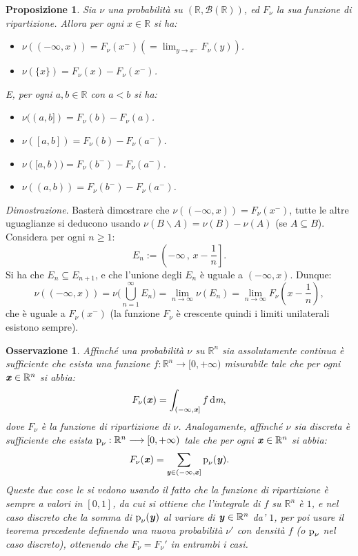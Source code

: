 \documentclass[11pt]{book}
\makeatletter
\theoremstyle{Definizione}
\theoremstyle{TeoremaProposizioneLemmaCorollario}
\newtheorem{mypropo}[myteo]{Proposizione}
\theoremstyle{OsservazioneNota}
\newtheorem{myobs}{Osservazione}[section]
\renewenvironment{proof}[1][\proofname]{\par
  \normalfont \topsep6\p@\@plus6\p@\relax
  \trivlist
  \item[\hskip\labelsep
        \itshape
    #1\@addpunct{.}]\ignorespaces
}{%
  \endtrivlist\@endpefalse
}
\newcommand{\R}{\mathbb{R}}
\newcommand{\tolto}{\smallsetminus}
\newcommand{\gri}[1]{\textbf{\textit{{#1}}}}
\renewcommand{\d}{\mathrm{d}}
\newcommand{\dm}{\,\d \textit{m}}
\newcommand{\p}{\textup{p}}
\renewenvironment{proof}{\textsl{Dimostrazione}.}{}
\makeatother
\begin{document}
\begin{boxpro}
\begin{mypropo}
Sia $\nu$ una probabilità su $(\R,\mathcal{B}(\R))$, ed $F_\nu$ la sua funzione di ripartizione. Allora per ogni $x\in \R$ si ha:
\begin{itemize}
\item[$(i)$] $\nu((-\infty,x)) = F_\nu(x^-) (= \lim_{y \to x^-} F_\nu(y))$.
\item[$(ii)$] $\nu(\{x\}) = F_\nu(x)-F_\nu(x^-)$.
\end{itemize}
E, per ogni $a,b\in \R$ con $a<b$ si ha:
\begin{itemize}
\item[$(i)'$] $\nu((a,b]) = F_\nu(b)-F_\nu(a)$.
\item[$(ii)'$] $\nu([a,b]) = F_\nu(b)-F_\nu(a^-)$.
\item[$(iii)'$] $\nu([a,b)) = F_\nu(b^-)-F_\nu(a^-)$.
\item[$(iv)$] $\nu((a,b)) = F_\nu(b^-)-F_\nu(a^-)$.
\end{itemize}
\end{mypropo}
\tcblower
\begin{proof}
Basterà dimostrare che $\nu((-\infty,x))= F_\nu(x^-)$, tutte le altre uguaglianze si deducono usando $\nu(B\tolto A) = \nu(B)-\nu(A)$ (se $A\subseteq B$).\\
Considera per ogni $n \geq 1$:
$$
E_n := \left(-\infty\,,\, x-\frac{1}{n}\right].
$$
Si ha che $E_n \subseteq E_{n+1}$, e che l'unione degli $E_n$ è uguale a $(-\infty,x)$. Dunque:
$$
\nu((-\infty,x)) = \nu\Bigg(\bigcup_{n = 1}^\infty E_n\Bigg) = \lim_{n \to \infty} \nu(E_n) = \lim_{n \to \infty} F_\nu\left(x-\frac{1}{n}\right),
$$
che è uguale a $F_\nu(x^-)$ (la funzione $F_\nu$ è crescente quindi i limiti unilaterali esistono sempre).
\end{proof}
\end{boxpro}
\begin{myobs}
Affinché una probabilità $\nu$ su $\R^n$ sia assolutamente continua è sufficiente che esista una funzione $f:\R^n \longrightarrow [0,+\infty)$ misurabile tale che per ogni $\gri{x}\in \R^n$ si abbia:
$$
F_\nu(\gri{x}) = \int_{(-\infty,\gri{x}]} f \dm,
$$
dove $F_\nu$ è la funzione di ripartizione di $\nu$. Analogamente, affinché $\nu$ sia discreta è sufficiente che esista $\p_\nu:\R^n \longrightarrow [0,+\infty)$ tale che per ogni $\gri{x}\in \R^n$ si abbia:
$$
F_\nu(\gri{x}) = \sum_{\gri{y}\in (-\infty,\gri{x}]} \p_\nu(\gri{y}).
$$
Queste due cose le si vedono usando il fatto che la funzione di ripartizione è sempre a valori in $[0,1]$, da cui si ottiene che l'integrale di $f$ su $\R^n$ è $1$, e nel caso discreto che la somma di $\p_\nu(\gri{y})$ al variare di $\gri{y}\in \R^n$ da' $1$, per poi usare il teorema precedente definendo una nuova probabilità $\nu'$ con densità $f$ (o $\p_\nu$ nel caso discreto), ottenendo che $F_\nu = F_\nu'$ in entrambi i casi.
\end{myobs}
\end{document}
